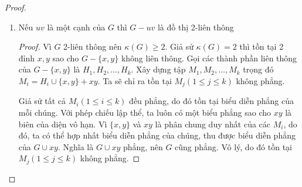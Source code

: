 \begin{proof}
\begin{enumerate}
\begin{proof}
\begin{figure}[H]
                      \caption*{Ví dụ phép chiếu lập thể từ mặt cầu đến mặt phẳng }
                  \end{figure}
                  Vậy $G$ là đồ thị 2-liên thông.

              \end{proof}

        \item Nếu $uv$ là một cạnh của $G$ thì $G-uv$ là đồ thị 2-liên thông
              \begin{proof}
                  Vì $G$ 2-liên thông nên $\kappa(G) \geq 2$. Giả sử $\kappa(G) =2$ thì tồn tại 2 đỉnh $x,y$ sao cho $G-\{x,y\}$ không liên thông.
                  Gọi các thành phần liên thông của $G-\{x,y\}$ là $H_1, H_2, \ldots,H_k$. Xây dựng tập $M_1,M_2,\ldots,M_k$ trọng đó $M_i=H_i \cup \{x,y\} +xy$.
                  Ta sẽ chỉ ra tồn tại $M_j (1 \leq j \leq k)$ không phẳng.

                  Giả sử tất cả $M_i (1 \leq i \leq k)$ đều phẳng, do đó tồn tại biểu diễn phẳng của mỗi chúng. Với phép chiếu lập thể, ta luôn có một biểu phẳng sao cho $xy$ là biên của diện vô hạn.
                  Vì $\{x,y\}$ và $xy$ là phân chung duy nhất của các $M_i$, do đó, ta có thể hợp nhất biểu diễn phẳng của chúng, thu được biểu diễn phẳng của $G\cup xy$.
                  Nghĩa là $G\cup xy$ phẳng, nên $G$ cũng phẳng. Vô lý, do đó tồn tại $M_j (1 \leq j \leq k)$ không phẳng.


\end{proof}
\end{enumerate}
\end{proof}
